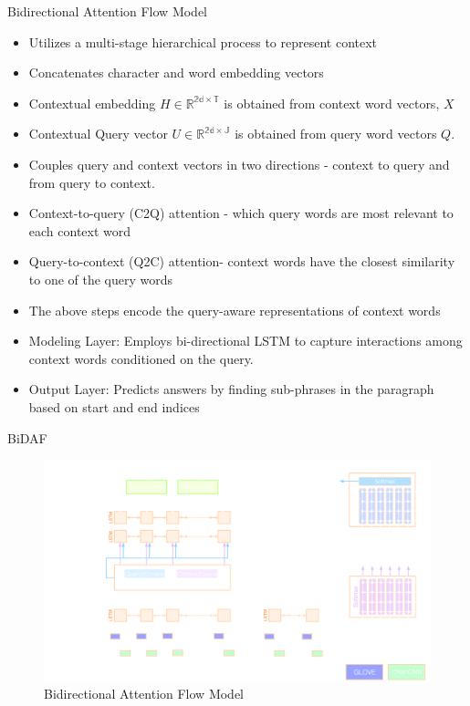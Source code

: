 \begin{frame}{Bidirectional Attention Flow Model}
    \begin{itemize}
        \item
        Utilizes  a multi-stage hierarchical process to represent context\cite{seo2018bidirectionalattentionflowmachine}
        \item Concatenates  character and word embedding vectors
        \item Contextual embedding $H \in \mathbb{R^{2d\times T}}$ is obtained from context word vectors, $X$
        \item Contextual Query vector $U\in \mathbb{R^{2d\times J}}$ is obtained from query word vectors $Q$.
 \item Couples query and context vectors in two directions - context to query and from query to context.
 \item Context-to-query (C2Q) attention - which query words are most relevant to each context word
 \item Query-to-context (Q2C) attention- context words have the closest similarity to one of the query words
 \item The above steps  encode the query-aware representations of context words

        \item Modeling Layer: Employs bi-directional LSTM to capture interactions among context words conditioned on the query.
        \item Output Layer: Predicts answers by finding sub-phrases in the paragraph based on start and end indices

    \end{itemize}
\end{frame}
\begin{frame}{BiDAF}
    \begin{figure}
        \centering
        \includegraphics[width=0.9\linewidth]{Images/BidirectionalAttentionFlowModel}
        \caption{Bidirectional Attention Flow Model}
        \label{fig:bidirectionalattentionflowmodel}
    \end{figure}
\end{frame}
